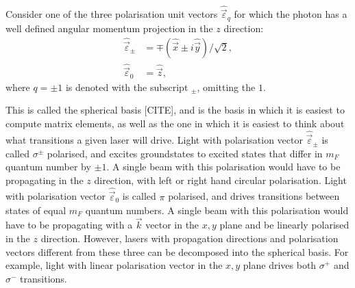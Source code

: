 Consider one of the three polarisation unit vectors $\hat{\vec\varepsilon}_q$ for which the photon has a well defined angular momentum projection in the $z$ direction:
\begin{align}
\hat{\vec\varepsilon}_{\pm} &= \mp(\hat{\vec{x}} \pm i \hat{\vec y})/\sqrt{2},\\
\hat{\vec\varepsilon}_{0} &= \hat{\vec z},
\end{align}
where $q=\pm1$ is denoted with the subscript $_\pm$, omitting the $1$. 

This is called the spherical basis [CITE], and is the basis in which it is easiest to compute matrix elements, as well as the one in which it is easiest to think about what transitions a given laser will drive. Light with polarisation vector $\hat{\vec\varepsilon}_{\pm}$ is called $\sigma^\pm$ polarised, and excites groundstates to excited states that differ in $m_F$ quantum number by $\pm 1$. A single beam with this polarisation would have to be propagating in the $z$ direction, with left or right hand circular polarisation. Light with polarisation vector $\hat{\vec\varepsilon}_0$ is called $\pi$ polarised, and drives transitions between states of equal $m_F$ quantum numbers. A single beam with this polarisation would have to be propagating with a $\vec k$ vector in the $x,y$ plane and be linearly polarised in the $z$ direction. However, lasers with propagation directions and polarisation vectors different from these three can be decomposed into the spherical basis. For example, light with linear polarisation vector in the $x,y$ plane drives both $\sigma^+$ and $\sigma^-$ transitions.

